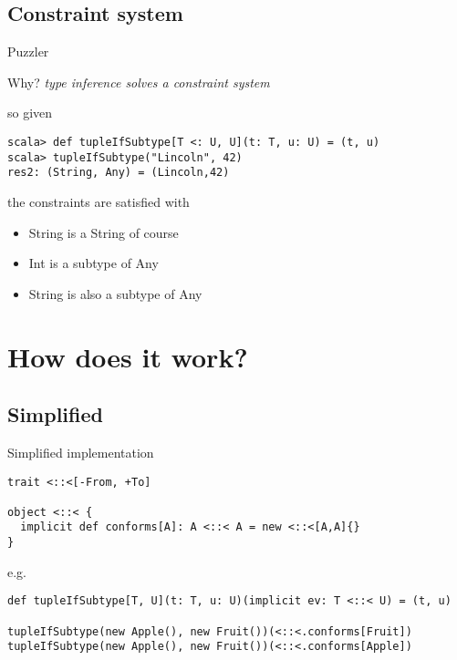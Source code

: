 \documentclass[11pt]{beamer}
\begin{document}
\subsection{Constraint system}
\begin{frame}[fragile] {Puzzler}
\begin{block}{Why?}
\textit{type inference solves a constraint system}
\end{block}\pause

\begin{block}{so given}
\begin{lstlisting} 
scala> def tupleIfSubtype[T <: U, U](t: T, u: U) = (t, u)
scala> tupleIfSubtype("Lincoln", 42)
res2: (String, Any) = (Lincoln,42)
\end{lstlisting} 
\end{block}

\begin{block}{the constraints are satisfied with}
\begin{itemize}
\item String is a String of course
\item Int is a subtype of Any
\item String is also a subtype of Any
\end{itemize}
\end{block}
\end{frame}



\section{How does it work?}
\subsection{Simplified}
\begin{frame}[fragile] {Simplified implementation}
\begin{lstlisting} 
trait <::<[-From, +To]

object <::< {
  implicit def conforms[A]: A <::< A = new <::<[A,A]{}
}
\end{lstlisting} \pause

\begin{block}{e.g.}
\begin{lstlisting} 
def tupleIfSubtype[T, U](t: T, u: U)(implicit ev: T <::< U) = (t, u)

tupleIfSubtype(new Apple(), new Fruit())(<::<.conforms[Fruit])
tupleIfSubtype(new Apple(), new Fruit())(<::<.conforms[Apple])
\end{lstlisting} 
\end{block}
\end{frame}
\end{document}
